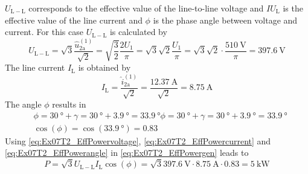 \begin{solutionblock}
    $U_{\mathrm{L-L}}$ corresponds to the effective value of the line-to-line voltage and $IU_{\mathrm{L}}$ is the effective value
    of the line current and $\phi$ is the phase angle between voltage and current. For this case $U_{\mathrm{L-L}}$ is calculated by
    \begin{equation}
        U_{\mathrm{L-L}}=\sqrt{3}\frac{\hat{u}_\mathrm{2a}^\mathrm{(1)}}{\sqrt{2}}
        = \sqrt{\frac{3}{2}} \frac{2U_\mathrm{1}}{\pi} = \sqrt{3}\sqrt{2}\frac{U_\mathrm{1}}{\pi}
        = \sqrt{3}\sqrt{2} \cdot \frac{\SI{510}{\volt}}{\pi}=\SI{397.6}{\volt}
        \label{eq:Ex07T2_EffPowervoltage}
    \end{equation}
    The line current $I_{\mathrm{L}}$ is obtained by
    \begin{equation}
        I_{\mathrm{L}}=\frac{\hat{i}_\mathrm{2a}^\mathrm{(1)}}{\sqrt{2}}
        = \frac{\SI{12.37}{\ampere}}{\sqrt{2}}=\SI{8.75}{\ampere}
        \label{eq:Ex07T2_EffPowercurrent}
    \end{equation}    
    The angle $\phi$ results in
    \begin{equation}
        \begin{split}        
            &\phi=\SI{30}{\degree}+ \gamma= \SI{30}{\degree}+\SI{3.9}{\degree}= \SI{33.9}{\degree}\phi=\SI{30}{\degree}+ \gamma= \SI{30}{\degree}+\SI{3.9}{\degree}= \SI{33.9}{\degree} \\
            &\cos(\phi)=\cos(\SI{33.9}{\degree})=0.83
        \end{split}          
        \label{eq:Ex07T2_EffPowerangle}
    \end{equation}
    Using \eqref{eq:Ex07T2_EffPowervoltage},  \eqref{eq:Ex07T2_EffPowercurrent} and  \eqref{eq:Ex07T2_EffPowerangle}
    in \eqref{eq:Ex07T2_EffPowergen} leads to
    \begin{equation}
        P=\sqrt{3} U_{\mathrm{L-L}} I_{\mathrm{L}} \cos(\phi)
        = \sqrt{3} \SI{397.6}{\volt} \cdot \SI{8.75}{\ampere} \cdot 0.83= \SI{5}{\kilo\watt}
    \end{equation}
\end{solutionblock}
